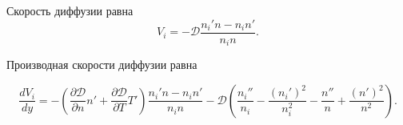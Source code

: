 \documentclass[12pt]{article}
\begin{document}
Скорость диффузии равна
\begin{equation}
  V_{i} = -\mathcal{D} \frac{n_{i}'n - n_{i}n'}{n_{i}n}.
\end{equation}





Производная скорости диффузии равна


\begin{equation}
  \frac{dV_{i}}{dy} = -\left(\frac{\partial \mathcal{D}}{\partial n}n' + \frac{\partial \mathcal{D}}{\partial T}T' \right) \frac{n_{i}'n - n_{i}n'}{n_{i}n} - \mathcal{D}\left(\frac{n_{i}''}{n_{i}} - \frac{\left(n_{i}'\right)^2}{n_{i}^2} - \frac{n''}{n} + \frac{\left(n'\right)^2}{n^2} \right).
\end{equation}
\end{document}
